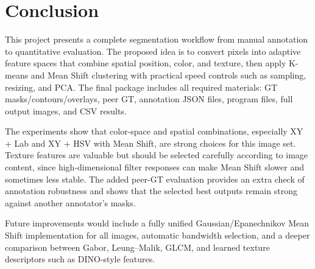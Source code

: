 
\section{Conclusion}
This project presents a complete segmentation workflow from manual annotation to quantitative evaluation. The proposed idea is to convert pixels into adaptive feature spaces that combine spatial position, color, and texture, then apply K-means and Mean Shift clustering with practical speed controls such as sampling, resizing, and PCA. The final package includes all required materials: GT masks/contours/overlays, peer GT, annotation JSON files, program files, full output images, and CSV results.

The experiments show that color-space and spatial combinations, especially XY + Lab and XY + HSV with Mean Shift, are strong choices for this image set. Texture features are valuable but should be selected carefully according to image content, since high-dimensional filter responses can make Mean Shift slower and sometimes less stable. The added peer-GT evaluation provides an extra check of annotation robustness and shows that the selected best outputs remain strong against another annotator's masks.

Future improvements would include a fully unified Gaussian/Epanechnikov Mean Shift implementation for all images, automatic bandwidth selection, and a deeper comparison between Gabor, Leung--Malik, GLCM, and learned texture descriptors such as DINO-style features.
